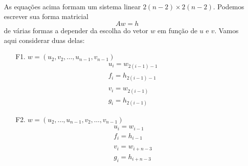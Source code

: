 \begin{exer}
  As equações acima formam um sistema linear $2(n-2)\times 2(n-2)$. Podemos escrever sua forma matricial
  \begin{equation}
    Aw = h
  \end{equation}
  de várias formas a depender da escolha do vetor $w$ em função de $u$ e $v$. Vamos aqui considerar duas delas:
  \begin{itemize}
  \item[F1.] $w = (u_2,v_2,\dotsc,u_{n-1},v_{n-1})$
    \begin{gather}
      u_i = w_{2(i-1)-1}\\
      f_i = h_{2(i-1)-1}\\
      ~\nonumber\\
      v_i = w_{2(i-1)}\\
      g_i = h_{2(i-1)}
    \end{gather}
  \item[F2.] $w = (u_2,\dotsc,u_{n-1},v_2,\dotsc,v_{n-1})$
    \begin{gather}
      u_i = w_{i-1}\\
      f_i = h_{i-1}\\
      ~\nonumber\\
      v_i = w_{i+n-3}\\
      g_i = h_{i+n-3}
    \end{gather}    
  \end{itemize}
\end{exer}
